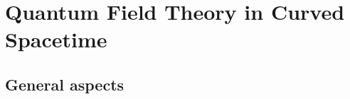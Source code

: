\documentclass[../QFT_main.tex]{subfiles}
\begin{document}
\chapter{Quantum Field Theory in Curved Spacetime}\label{ch:qft_in_curved_spacetime}


\section{General aspects} 
\end{document}
